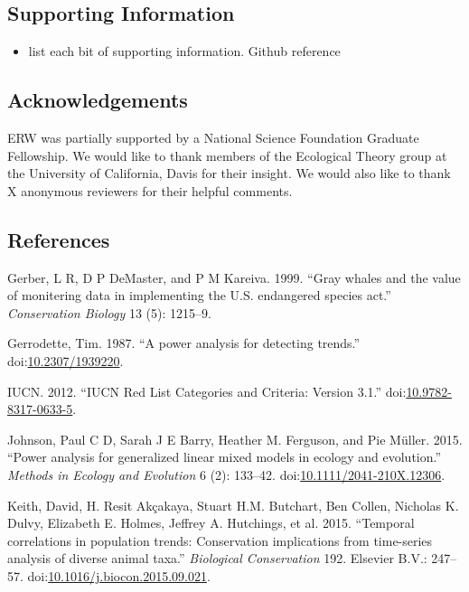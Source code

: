 \documentclass[12pt,]{article}
\providecommand{\tightlist}{%
  \setlength{\itemsep}{0pt}\setlength{\parskip}{0pt}}
\begin{document}
\subsection{Supporting Information}\label{supporting-information}

\begin{itemize}
\tightlist
\item
  list each bit of supporting information. Github reference
\end{itemize}

\subsection{Acknowledgements}\label{acknowledgements}

ERW was partially supported by a National Science Foundation Graduate
Fellowship. We would like to thank members of the Ecological Theory
group at the University of California, Davis for their insight. We would
also like to thank X anonymous reviewers for their helpful comments.

\subsection*{References}\label{references}

\hypertarget{refs}{}
\hypertarget{ref-Gerber1999}{}
Gerber, L R, D P DeMaster, and P M Kareiva. 1999. ``Gray whales and the
value of monitering data in implementing the U.S. endangered species
act.'' \emph{Conservation Biology} 13 (5): 1215--9.

\hypertarget{ref-Gerrodette1987}{}
Gerrodette, Tim. 1987. ``A power analysis for detecting trends.''
doi:\href{https://doi.org/10.2307/1939220}{10.2307/1939220}.

\hypertarget{ref-IUCN2012}{}
IUCN. 2012. ``IUCN Red List Categories and Criteria: Version 3.1.''
doi:\href{https://doi.org/10.9782-8317-0633-5}{10.9782-8317-0633-5}.

\hypertarget{ref-Johnson2015}{}
Johnson, Paul C D, Sarah J E Barry, Heather M. Ferguson, and Pie Müller.
2015. ``Power analysis for generalized linear mixed models in ecology
and evolution.'' \emph{Methods in Ecology and Evolution} 6 (2): 133--42.
doi:\href{https://doi.org/10.1111/2041-210X.12306}{10.1111/2041-210X.12306}.

\hypertarget{ref-Keith2015}{}
Keith, David, H. Resit Akçakaya, Stuart H.M. Butchart, Ben Collen,
Nicholas K. Dulvy, Elizabeth E. Holmes, Jeffrey A. Hutchings, et al.
2015. ``Temporal correlations in population trends: Conservation
implications from time-series analysis of diverse animal taxa.''
\emph{Biological Conservation} 192. Elsevier B.V.: 247--57.
doi:\href{https://doi.org/10.1016/j.biocon.2015.09.021}{10.1016/j.biocon.2015.09.021}.
\end{document}
